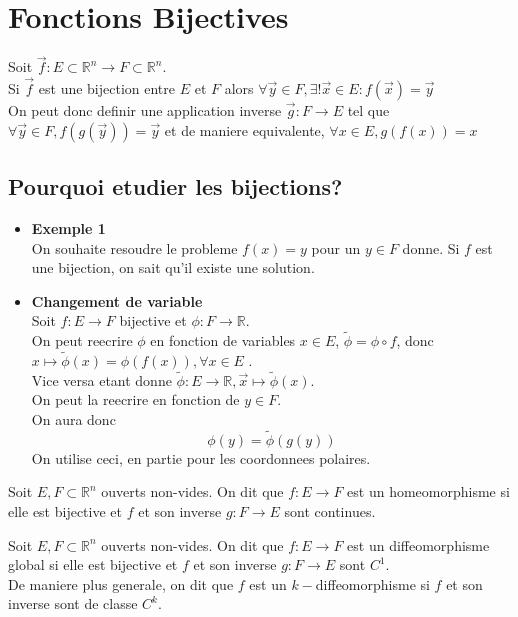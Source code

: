 \documentclass[../main.tex]{subfiles}
\begin{document}
\section{Fonctions Bijectives}
Soit $\vec{f}: E \subset \mathbb{R}^n \to F\subset\mathbb{R}^n$.\\
Si $\vec{f}$ est une bijection entre $E$ et $F$ alors $\forall \vec{y} \in F, \exists ! \vec{x} \in E: f( \vec{x}) = \vec{y}$\\
On peut donc definir une application inverse $\vec{g}: F \to E$ tel que
$\forall \vec{y} \in F, f( g( \vec{y}) )= \vec{y}$ et de maniere equivalente, $\forall x \in E, g( f( x) ) =x$
\subsection*{Pourquoi etudier les bijections?}
\begin{itemize}
	\item \textbf{Exemple 1}\\
		On souhaite resoudre le probleme $f( x) =y$ pour un $y \in F$ donne. Si $f$ est une bijection, on sait qu'il existe une solution.\\
	\item \textbf{ Changement de variable }\\
		Soit $f: E \to F$ bijective et $\phi: F \to \mathbb{R}$.\\
		On  peut reecrire $\phi$ en fonction de variables $x \in E$, $\tilde \phi = \phi \circ f$, donc $x \mapsto \tilde \phi ( x) = \phi( f( x) ), \forall x \in E $ .\\
		Vice versa etant donne $\tilde \phi : E \to \mathbb{R}, \vec{x} \mapsto \tilde \phi( x) $.\\
		On peut la reecrire en fonction de $y \in F$.\\
		On aura donc
		\[ 
			\phi( y) = \tilde \phi( g( y )) 
		\]
		On utilise ceci, en partie pour les coordonnees polaires.
\end{itemize}
\begin{defn}[Homeomorphisme]
	Soit $E, F\subset \mathbb{R}^n$ ouverts non-vides. On dit que $f: E \to F$ est un homeomorphisme si elle est bijective et $f$ et son inverse $g: F \to E$ sont continues.
\end{defn}
\begin{defn}[Diffeomorphisme]
	Soit $E, F\subset \mathbb{R}^n$ ouverts non-vides. On dit que $f: E \to F$ est un diffeomorphisme global si elle est bijective et $f$ et son inverse $g: F \to E$ sont $C^{1}$.\\
De maniere plus generale, on dit que $f$ est un $k-$diffeomorphisme si $f$ et son inverse sont de classe $C^{k}$.
\end{defn}
\end{document}
